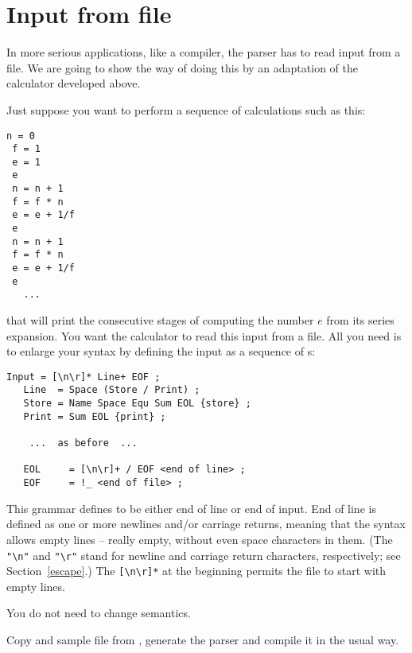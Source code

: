 
\section{Input from file\label{file}}


In more serious applications, like a compiler, the parser has to read 
input from a file.
We are going to show the way of doing this by an adaptation
of the calculator developed above.

Just suppose you want to perform a sequence of calculations such as this:

\small
\begin{Verbatim}[samepage=true,xleftmargin=15mm,baselinestretch=0.8]
 n = 0  
 f = 1
 e = 1
 e
 n = n + 1 
 f = f * n
 e = e + 1/f  
 e
 n = n + 1 
 f = f * n
 e = e + 1/f  
 e
   ...
\end{Verbatim}
\normalsize

that will print the consecutive stages of computing the number $e$
from its series expansion.
You want the calculator to read this input from a file.
All you need is to enlarge your syntax by defining the input
as a sequence of s:

\small
\begin{Verbatim}[frame=single,framesep=2mm,samepage=true,xleftmargin=15mm,xrightmargin=15mm,baselinestretch=0.8]
   Input = [\n\r]* Line+ EOF ;
   Line  = Space (Store / Print) ;
   Store = Name Space Equ Sum EOL {store} ;
   Print = Sum EOL {print} ;

    ...  as before  ...   

   EOL     = [\n\r]+ / EOF <end of line> ;
   EOF     = !_ <end of file> ;
\end{Verbatim}
\normalsize

This grammar defines  to be either end of line
or end of input.
End of line is defined as one or more newlines and/or carriage returns,
meaning that the syntax allows empty lines -- really empty, without
even space characters in them.
(The \verb#"\n"# and \verb#"\r"# stand for newline and carriage
return characters, respectively; see Section~\ref{escape}.)
The \verb#[\n\r]*# at the beginning permits the file to start with empty lines.

You do not need to change semantics.

Copy  and sample file  from ,
generate the parser and compile it in the usual way.

